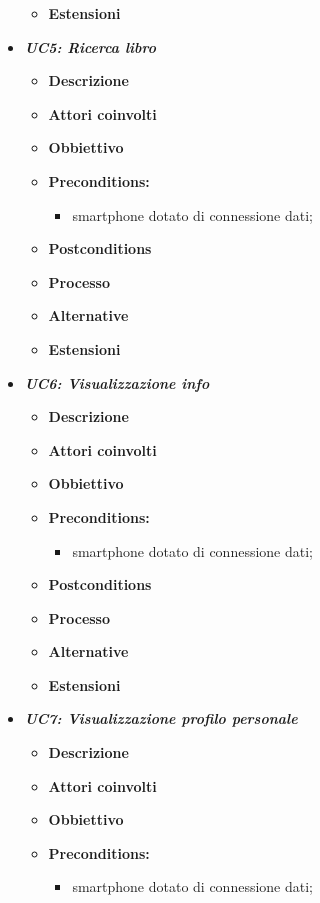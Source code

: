 \begin{itemize}
\begin{itemize}
		\item \textbf{Estensioni}
	\end{itemize}
	\item \textbf{\textit{UC5: Ricerca libro}}
	\begin{itemize}
		\item \textbf{Descrizione}
		\item \textbf{Attori coinvolti}
		\item \textbf{Obbiettivo}
		\item \textbf{Preconditions:}
		\begin{itemize}
			\item smartphone dotato di connessione dati;
		\end{itemize}
		\item \textbf{Postconditions}
		\item \textbf{Processo}
		\item \textbf{Alternative}
		\item \textbf{Estensioni}
	\end{itemize}
	\item \textbf{\textit{UC6: Visualizzazione info}}
	\begin{itemize}
		\item \textbf{Descrizione}
		\item \textbf{Attori coinvolti}
		\item \textbf{Obbiettivo}
		\item \textbf{Preconditions:}
		\begin{itemize}
			\item smartphone dotato di connessione dati;
		\end{itemize}
		\item \textbf{Postconditions}
		\item \textbf{Processo}
		\item \textbf{Alternative}
		\item \textbf{Estensioni}
	\end{itemize}
	\item \textbf{\textit{UC7: Visualizzazione profilo personale}}
	\begin{itemize}
		\item \textbf{Descrizione}
		\item \textbf{Attori coinvolti}
		\item \textbf{Obbiettivo}
		\item \textbf{Preconditions:}
		\begin{itemize}
			\item smartphone dotato di connessione dati;

\end{itemize}
\end{itemize}
\end{itemize}
